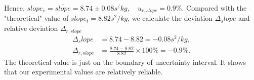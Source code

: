     Hence, $slope_e=\overline{slope}=8.74\pm 0.08s^/kg, \quad u_{r,slope}=0.9\%$. Compared with the "theoretical" value of $slope_t=8.82s^2/kg$, we calculate the deviation $\Delta_slope$ and relative deviation $\Delta_{r,slope}$
    \[
    \begin{split}
        \Delta_slope&=8.74-8.82=-0.08s^2/kg,\\
        \Delta_{r,slope}&=\frac{8.74-8.82}{8.82}\times 100\%=-0.9\%.
    \end{split}
    \]
    The theoretical value is just on the boundary of uncertainty interval. It shows that our experimental values are relatively reliable.

